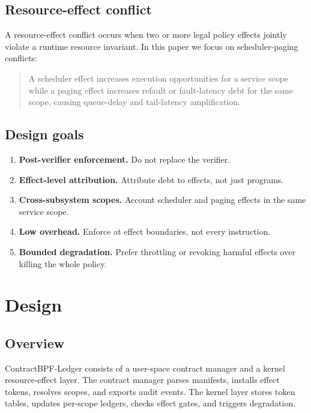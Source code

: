 \documentclass[letterpaper,twocolumn,10pt]{article}
\newcommand{\sys}{ContractBPF-Ledger\xspace}
\begin{document}
\subsection{Resource-effect conflict}

A resource-effect conflict occurs when two or more legal policy effects jointly violate a runtime resource invariant. In this paper we focus on scheduler-paging conflicts:

\begin{quote}
A scheduler effect increases execution opportunities for a service scope while a paging effect increases refault or fault-latency debt for the same scope, causing queue-delay and tail-latency amplification.
\end{quote}

\subsection{Design goals}

\begin{enumerate}[leftmargin=*]
    \item \textbf{Post-verifier enforcement.} Do not replace the verifier.
    \item \textbf{Effect-level attribution.} Attribute debt to effects, not just programs.
    \item \textbf{Cross-subsystem scopes.} Account scheduler and paging effects in the same service scope.
    \item \textbf{Low overhead.} Enforce at effect boundaries, not every instruction.
    \item \textbf{Bounded degradation.} Prefer throttling or revoking harmful effects over killing the whole policy.
\end{enumerate}

\section{Design}

\subsection{Overview}

\sys consists of a user-space contract manager and a kernel resource-effect layer. The contract manager parses manifests, installs effect tokens, resolves scopes, and exports audit events. The kernel layer stores token tables, updates per-scope ledgers, checks effect gates, and triggers degradation.
\end{document}

